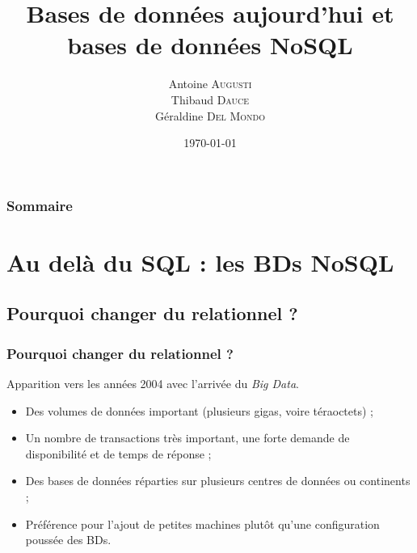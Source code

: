 \documentclass[handout]{beamer}
\title{
	Bases de données aujourd'hui et bases de données NoSQL
}
\author{
	Antoine \textsc{Augusti}\\
	\vspace{5px}
	Thibaud \textsc{Dauce} \\
	\vspace{5px}
	Géraldine \textsc{Del Mondo} \\
}
\date{\today}
\begin{document}
	\begin{frame}[plain]
		\titlepage
	\end{frame}

	\begin{frame}[plain]
		\frametitle{Sommaire}
		\tableofcontents
	\end{frame}


	\section{Au delà du SQL : les BDs NoSQL}

		\subsection{Pourquoi changer du relationnel ?}
		\begin{frame}
			\frametitle{Pourquoi changer du relationnel ?}

			Apparition vers les années 2004 avec l'arrivée du \textit{Big Data}.
			\begin{itemize}
				\item Des volumes de données important (plusieurs gigas, voire téraoctets) ;
				\item Un nombre de transactions très important, une forte demande de disponibilité et de temps de réponse ;
				\item Des bases de données réparties sur plusieurs centres de données ou continents ;
				\item Préférence pour l'ajout de petites machines plutôt qu'une configuration poussée des BDs.
			\end{itemize}

		\end{frame}

\end{document}
